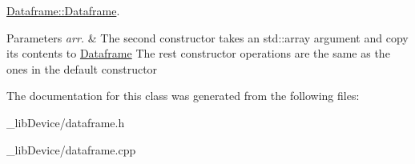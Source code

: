 \hyperlink{class_dataframe_aa477a9e2ad938c736318df7263e5317c}{Dataframe\+::\+Dataframe}. 


\begin{DoxyParams}{Parameters}
{\em arr.} & The second constructor takes an std\+::array argument and copy its contents to \hyperlink{class_dataframe}{Dataframe} The rest constructor operations are the same as the ones in the default constructor \\
\hline
\end{DoxyParams}


The documentation for this class was generated from the following files\+:\begin{DoxyCompactItemize}
\item 
\+\_\+lib\+Device/dataframe.\+h\item 
\+\_\+lib\+Device/dataframe.\+cpp\end{DoxyCompactItemize}
